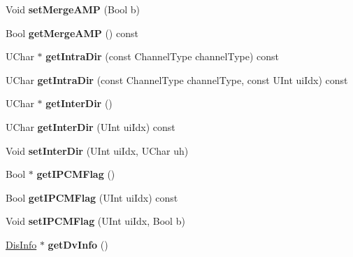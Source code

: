 \begin{DoxyCompactItemize}
Void {\bfseries set\+Merge\+A\+MP} (Bool b)
\item 
\mbox{\label{class_t_com_data_c_u_a7bf75a2cdb43081e3f199e43211a9d32}} 
Bool {\bfseries get\+Merge\+A\+MP} () const
\item 
\mbox{\label{class_t_com_data_c_u_acbad1bbc23ac2220de56173243213d29}} 
U\+Char $\ast$ {\bfseries get\+Intra\+Dir} (const Channel\+Type channel\+Type) const
\item 
\mbox{\label{class_t_com_data_c_u_ad6935b149109b8ed5835c5a756a23925}} 
U\+Char {\bfseries get\+Intra\+Dir} (const Channel\+Type channel\+Type, const U\+Int ui\+Idx) const
\item 
\mbox{\label{class_t_com_data_c_u_a4653ced37359067643bf1da6412a51ef}} 
U\+Char $\ast$ {\bfseries get\+Inter\+Dir} ()
\item 
\mbox{\label{class_t_com_data_c_u_a776ef84a8c10e5cb1b450dd4b4334be2}} 
U\+Char {\bfseries get\+Inter\+Dir} (U\+Int ui\+Idx) const
\item 
\mbox{\label{class_t_com_data_c_u_acdac938626206561638a380d960d2a7e}} 
Void {\bfseries set\+Inter\+Dir} (U\+Int ui\+Idx, U\+Char uh)
\item 
\mbox{\label{class_t_com_data_c_u_a8e51044738c49342877d22b0e3a36ba9}} 
Bool $\ast$ {\bfseries get\+I\+P\+C\+M\+Flag} ()
\item 
\mbox{\label{class_t_com_data_c_u_a23445dfb62e8950ea2b34cfc636448bb}} 
Bool {\bfseries get\+I\+P\+C\+M\+Flag} (U\+Int ui\+Idx) const
\item 
\mbox{\label{class_t_com_data_c_u_a6a7ef3aaa9d6e05cab2ffbf61266c48e}} 
Void {\bfseries set\+I\+P\+C\+M\+Flag} (U\+Int ui\+Idx, Bool b)
\item 
\mbox{\label{class_t_com_data_c_u_a63d35e3593bb4752b1717e817e052b02}} 
\hyperlink{struct___dis_cand}{Dis\+Info} $\ast$ {\bfseries get\+Dv\+Info} ()
\item 
\mbox{\label{class_t_com_data_c_u_ab2b869b1ce548afd3a186ff80e56a503}} 

\end{DoxyCompactItemize}
